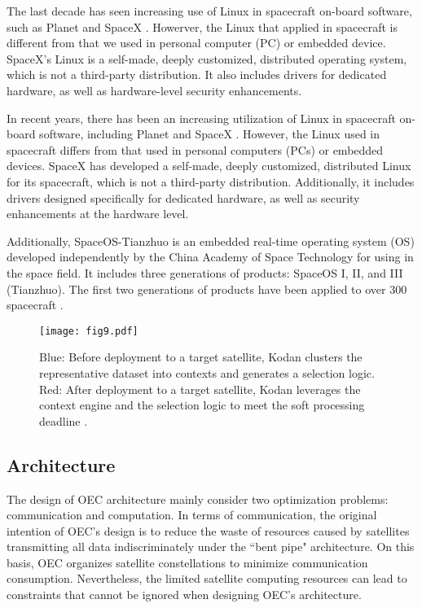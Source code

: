 \documentclass[lettersize,journal]{IEEEtran}
\begin{document}
The last decade has seen increasing use of Linux in spacecraft on-board software, such as Planet and SpaceX \cite{linux1,linux2}. Howerver, the Linux that applied in spacecraft is different from that we used in personal computer (PC) or embedded device.  SpaceX's Linux is a self-made, deeply customized, distributed operating system, which is not a third-party distribution. It also includes drivers for dedicated hardware, as well as hardware-level security enhancements.
 
In recent years, there has been an increasing utilization of Linux in spacecraft on-board software, including Planet and SpaceX \cite{linux1,linux2}. However, the Linux used in spacecraft differs from that used in personal computers (PCs) or embedded devices. SpaceX has developed a self-made, deeply customized, distributed Linux for its spacecraft, which is not a third-party distribution. Additionally, it includes drivers designed specifically for dedicated hardware, as well as security enhancements at the hardware level.

Additionally, SpaceOS-Tianzhuo is an embedded real-time operating system (OS) developed independently by the China Academy of Space Technology for using in the space field. It includes three generations of products: SpaceOS I, II, and III (Tianzhuo). The first two generations of products have been applied to over 300 spacecraft \cite{spaceos}.


\begin{figure}[htbp!]
  \centering
  \texttt{[image: fig9.pdf]}
  \caption{Blue: Before deployment to a target satellite, Kodan clusters the representative dataset into contexts and generates a selection logic. Red: After deployment to a target satellite, Kodan leverages the context engine and the selection logic to meet the soft processing deadline \cite{denby2023kodan}. }
  \label{fig:9}
\end{figure}


\subsection{Architecture}

The design of OEC architecture mainly consider two optimization problems: communication and computation. In terms of communication, the original intention of OEC's design is to reduce the waste of resources caused by satellites transmitting all data indiscriminately under the ``bent pipe" architecture. On this basis, OEC organizes satellite constellations to minimize communication consumption. Nevertheless, the limited satellite computing resources can lead to constraints that cannot be ignored when designing OEC's architecture.
\end{document}
